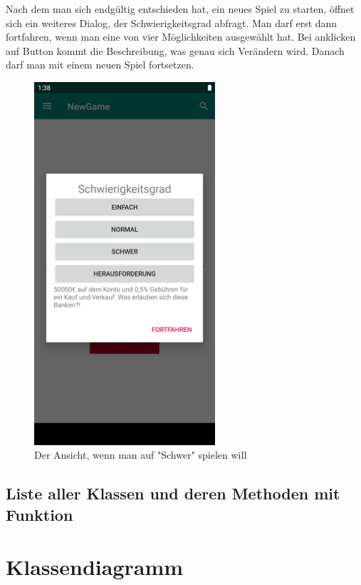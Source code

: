 \documentclass[10pt]{scrartcl}
\begin{document}
Nach dem man sich endgültig entschieden hat, ein neues Spiel zu starten, öffnet sich ein weiteres Dialog, der Schwierigkeitsgrad abfragt. Man darf erst dann fortfahren, wenn man eine von vier Möglichkeiten ausgewählt hat. Bei anklicken auf Button kommt die Beschreibung, was genau sich Verändern wird. Danach darf man mit einem neuen Spiel fortsetzen.

\begin{figure}[H]
	\centering
	\includegraphics[width=0.6\textwidth]{Bilder/Applikation/schwierigkeitsgrad.png}
	\caption{Der Ansicht, wenn man auf "Schwer" spielen will}
\end{figure}

\subsection{Liste aller Klassen und deren Methoden mit Funktion}
\section{Klassendiagramm}
\end{document}
